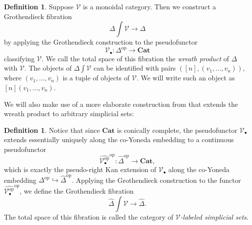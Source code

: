 \documentclass[a4paper]{article}
\numberwithin{equation}{subsection}
\theoremstyle{plain}   %
\theoremstyle{definition}
\newtheorem{defn}[equation]{Definition}
\theoremstyle{remark}
\theoremstyle{plain}
\newcommand{\op}{\ensuremath{\mathrm{op}}}
\newcommand{\Cat}{\ensuremath{\mathbf{Cat}}}
\newcommand{\psh}[1]{\ensuremath{\widehat{#1}}}
\begin{document}
\begin{defn}
	Suppose \(\mathcal{V}\) is a monoidal category.  Then we construct a Grothendieck fibration 
	\[
		\Delta\int\mathcal{V}\to \Delta
	\]
	by applying the Grothendieck construction to the pseudofunctor
	\[
		\mathcal{V}_\bullet:\Delta^\op\to \Cat
	\]
	classifying \(\mathcal{V}\). We call the total space of this fibration the \emph{wreath product} of \(\Delta\) with \(\mathcal{V}\).  The objects of \(\Delta\int \mathcal{V}\) can be identified with pairs \(([n],(v_1,\dots,v_n)),\) where \((v_1,\dots,v_n)\) is a tuple of objects of \(\mathcal{V}\).  We will write such an object as \([n](v_1,\dots,v_n)\).
\end{defn}
We will also make use of a more elaborate construction from \cite{oury} that extends the wreath product to arbitrary simplicial sets:
\begin{defn}
	Notice that since \(\Cat\) is conically complete, the pseudofunctor \(\mathcal{V}_\bullet\) extends essentially uniquely along the co-Yoneda embedding to a continuous pseudofunctor 
	\[
		\psh{\mathcal{V}^\op_\bullet}^\op: \psh{\Delta}^\op \to \Cat,
	\]
	which is exactly the pseudo-right Kan extension of \(\mathcal{V}_\bullet\) along the co-Yoneda embedding \(\Delta^\op \hookrightarrow \psh{\Delta}^\op\).  Applying the Grothendieck construction to the functor \(\psh{\mathcal{V}^\op_\bullet}^\op\), we define the Grothendieck fibration
	\[
		\psh{\Delta}\int \mathcal{V} \to \psh{\Delta}.
	\]
	The total space of this fibration is called the category of \emph{\(\mathcal{V}\)-labeled simplicial sets}.
	


\end{defn}
\end{document}
